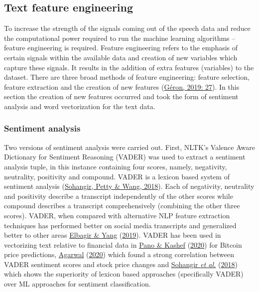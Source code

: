 \documentclass[11pt,preprint, authoryear]{elsarticle}
\numberwithin{equation}{section}
\numberwithin{figure}{section}
\numberwithin{table}{section}
\begin{document}
\hypertarget{text-feature-engineering}{%
\subsection{Text feature engineering}\label{text-feature-engineering}}

To increase the strength of the signals coming out of the speech data
and reduce the computational power required to run the machine learning
algorithms -- feature engineering is required. Feature engineering
refers to the emphasis of certain signals within the available data and
creation of new variables which capture these signals. It results in the
addition of extra features (variables) to the dataset. There are three
broad methods of feature engineering: feature selection, feature
extraction and the creation of new features
(\protect\hyperlink{ref-geron2019hands}{Géron, 2019: 27}). In this
section the creation of new features occurred and took the form of
sentiment analysis and word vectorization for the text data.

\hypertarget{sentiment-analysis}{%
\subsubsection{Sentiment analysis}\label{sentiment-analysis}}

Two versions of sentiment analysis were carried out. First, NLTK's
Valence Aware Dictionary for Sentiment Reasoning (VADER) was used to
extract a sentiment analysis tuple, in this instance containing four
scores, namely, negativity, neutrality, positivity and compound. VADER
is a lexicon based system of sentiment analysis
(\protect\hyperlink{ref-sohangir2018financial}{Sohangir, Petty \& Wang,
2018}). Each of negativity, neutrality and positivity describe a
transcript independently of the other scores while compound describes a
transcript comprehensively (combining the other three scores). VADER,
when compared with alternative NLP feature extraction techniques has
performed better on social media transcripts and generalized better to
other areas \protect\hyperlink{ref-elbagir2019twitter}{Elbagir \& Yang}
(\protect\hyperlink{ref-elbagir2019twitter}{2019}). VADER has been used
in vectorizing text relative to financial data in
\protect\hyperlink{ref-pano2020complete}{Pano \& Kashef}
(\protect\hyperlink{ref-pano2020complete}{2020}) for Bitcoin price
predictions, \protect\hyperlink{ref-agarwal2020sentiment}{Agarwal}
(\protect\hyperlink{ref-agarwal2020sentiment}{2020}) which found a
strong correlation between VADER sentiment scores and stock price
changes and \protect\hyperlink{ref-sohangir2018financial}{Sohangir
\emph{et al.}} (\protect\hyperlink{ref-sohangir2018financial}{2018})
which shows the superiority of lexicon based approaches (specifically
VADER) over ML approaches for sentiment classification.
\end{document}
